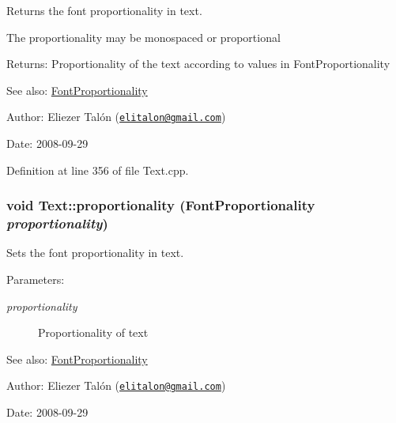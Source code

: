 Returns the font proportionality in text. 

The proportionality may be monospaced or proportional

\begin{Desc}
\item[Returns:]Proportionality of the text according to values in FontProportionality\end{Desc}
\begin{Desc}
\item[See also:]\hyperlink{_font_proportionality_8h_a9aa255df24db58a9b4cbc46941f2ac1}{FontProportionality}\end{Desc}
\begin{Desc}
\item[Author:]Eliezer Talón (\href{mailto:elitalon@gmail.com}{\tt elitalon@gmail.com}) \end{Desc}
\begin{Desc}
\item[Date:]2008-09-29 \end{Desc}


Definition at line 356 of file Text.cpp.\hypertarget{class_text_90ebca7fe222314f1c50c4e36559ca64}{
\subsubsection[proportionality]{\setlength{\rightskip}{0pt plus 5cm}void Text::proportionality ({\bf FontProportionality} {\em proportionality})}}
\label{class_text_90ebca7fe222314f1c50c4e36559ca64}


Sets the font proportionality in text. 

\begin{Desc}
\item[Parameters:]
\begin{description}
\item[{\em proportionality}]Proportionality of text\end{description}
\end{Desc}
\begin{Desc}
\item[See also:]\hyperlink{_font_proportionality_8h_a9aa255df24db58a9b4cbc46941f2ac1}{FontProportionality}\end{Desc}
\begin{Desc}
\item[Author:]Eliezer Talón (\href{mailto:elitalon@gmail.com}{\tt elitalon@gmail.com}) \end{Desc}
\begin{Desc}
\item[Date:]2008-09-29 \end{Desc}



